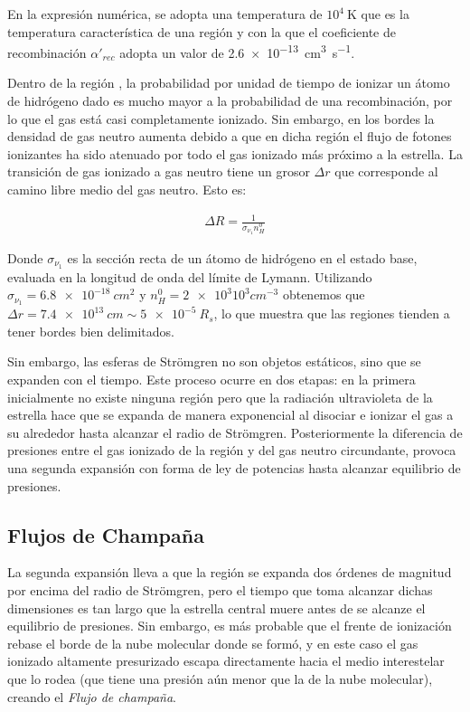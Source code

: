 En la expresión numérica, se adopta una temperatura de $10^4\mathrm{~K}$ que es la temperatura característica de una región  y con la que el coeficiente de recombinación $\alpha'_{rec}$ adopta un valor de \SI{2.6e-13}{cm^3.s^{-1}}.

Dentro de la región , la probabilidad por unidad de tiempo de ionizar un átomo de hidrógeno dado es mucho mayor a la probabilidad de una recombinación, por lo que el gas está casi completamente ionizado. Sin embargo, en los bordes la densidad de gas neutro aumenta debido a que en dicha región el flujo de fotones ionizantes ha sido atenuado por todo el gas ionizado más próximo a la estrella. La transición de gas ionizado a gas neutro tiene un grosor $\Delta r$ que corresponde al camino libre medio del gas neutro. Esto es:

\begin{align}
\Delta R = \frac{1}{\sigma_{\nu_1}n^0_H}  
\end{align}

Donde $\sigma_{\nu_1}$ es la sección recta de un átomo de hidrógeno en el estado base, evaluada en la longitud de onda del límite de Lymann. Utilizando $\sigma_{\nu_1} = \SI{6.8e-18}{cm^2}$ y $n^0_H = \SI{2e3} 10^{3}{cm^{-3}}$ obtenemos que $\Delta r = \SI{7.4e13}{cm} \sim \SI{5e-5}{R_s}$, lo que muestra que las regiones  tienden a tener bordes bien delimitados.

Sin embargo, las esferas de Strömgren no son objetos estáticos, sino que se expanden con el tiempo. Este proceso ocurre en dos etapas: en la primera inicialmente no existe ninguna región  pero que la radiación ultravioleta de la estrella hace que se expanda de manera exponencial al disociar e ionizar el gas a su alrededor hasta alcanzar el radio de Strömgren. Posteriormente la diferencia de presiones entre el gas ionizado de la región  y del gas neutro circundante, provoca una segunda expansión con forma de ley de potencias hasta alcanzar equilibrio de presiones.

\subsection{Flujos de Champaña}
La segunda expansión lleva a que la región  se expanda dos órdenes de magnitud por encima del radio de Strömgren, pero el tiempo que toma alcanzar dichas dimensiones es tan largo que la estrella central muere antes de se alcanze el equilibrio de presiones. Sin embargo, es más probable que el frente de ionización rebase el borde de la nube molecular donde se formó, y en este caso el gas ionizado altamente presurizado escapa directamente hacia el medio interestelar que lo rodea (que tiene una presión aún menor que la de la nube molecular), creando el \textit{Flujo de champaña}.

